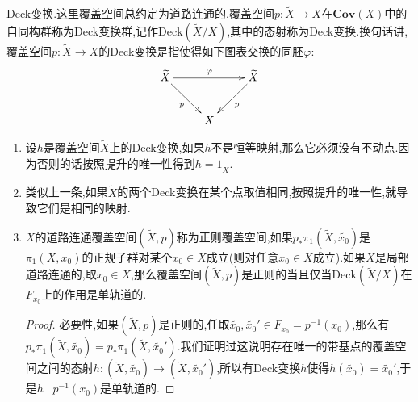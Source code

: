 Deck变换.这里覆盖空间总约定为道路连通的.覆盖空间$p:\widetilde{X}\to X$在$\textbf{Cov}(X)$中的自同构群称为Deck变换群,记作$\mathrm{Deck}(\widetilde{X}/X)$,其中的态射称为Deck变换.换句话讲,覆盖空间$p:\widetilde{X}\to X$的Deck变换是指使得如下图表交换的同胚$\varphi$:
$$\xymatrix{\widetilde{X}\ar[dr]_{p}\ar[rr]^{\varphi}&&\widetilde{X}\ar[dl]^{p}\\&X&}$$
\begin{enumerate}
	\item 设$h$是覆盖空间$\widetilde{X}$上的Deck变换,如果$h$不是恒等映射,那么它必须没有不动点.因为否则的话按照提升的唯一性得到$h=1_{\widetilde{X}}$.
	\item 类似上一条,如果$\widetilde{X}$的两个Deck变换在某个点取值相同,按照提升的唯一性,就导致它们是相同的映射.
	\item $X$的道路连通覆盖空间$(\widetilde{X},p)$称为正则覆盖空间,如果$p_*\pi_1(\widetilde{X},\widetilde{x_0})$是$\pi_1(X,x_0)$的正规子群对某个$x_0\in X$成立(则对任意$x_0\in X$成立).如果$X$是局部道路连通的,取$x_0\in X$,那么覆盖空间$(\widetilde{X},p)$是正则的当且仅当$\mathrm{Deck}(\widetilde{X}/X)$在$F_{x_0}$上的作用是单轨道的.
	\begin{proof}
		
		必要性,如果$(\widetilde{X},p)$是正则的,任取$\widetilde{x_0},\widetilde{x_0}'\in F_{x_0}=p^{-1}(x_0)$,那么有$p_*\pi_1(\widetilde{X},\widetilde{x_0})=p_*\pi_1(\widetilde{X},\widetilde{x_0}')$.我们证明过这说明存在唯一的带基点的覆盖空间之间的态射$h:(\widetilde{X},\widetilde{x_0})\to(\widetilde{X},\widetilde{x_0}')$,所以有Deck变换$h$使得$h(\widetilde{x_0})=\widetilde{x_0}'$,于是$h\mid p^{-1}(x_0)$是单轨道的.
		
		\qquad
		

\end{proof}
\end{enumerate}
